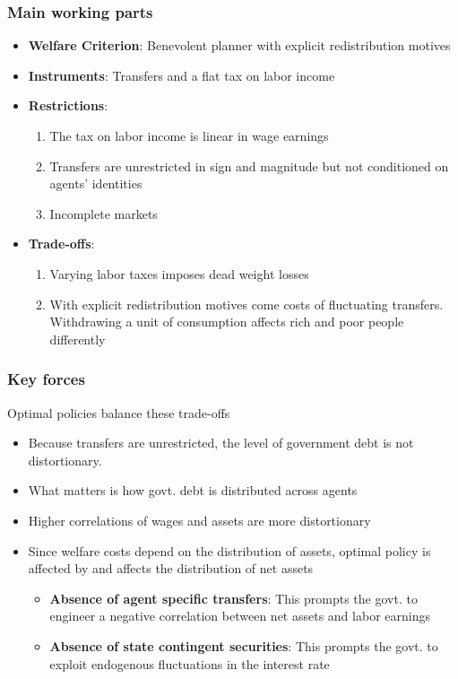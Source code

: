 \documentclass{beamer}
\begin{document}
\begin{frame}
 \frametitle{Main working parts}
\begin{itemize}
 \item \textbf{Welfare Criterion}: Benevolent planner with explicit redistribution motives
 \item \textbf{Instruments}: Transfers and a flat tax on labor income
 \item \textbf{Restrictions}:
 \begin{enumerate}
  \item The tax on labor income is linear in wage earnings
  \item Transfers are unrestricted in sign and magnitude  but not  conditioned on agents' identities
  \item Incomplete markets
 \end{enumerate}
\item \textbf{Trade-offs}:
\begin{enumerate}
\item Varying labor taxes imposes dead weight losses 
\item With  explicit redistribution motives come costs of fluctuating transfers. Withdrawing a unit of consumption affects rich and poor people differently
\end{enumerate}
\end{itemize}
\end{frame}
\begin{frame}
 \frametitle{Key forces}
 Optimal policies balance these trade-offs
 \begin{itemize}
 \item Because transfers are unrestricted, the level of government debt is not distortionary.
 \item  What matters is how govt. debt is distributed across agents
 \item Higher correlations of wages and assets are more distortionary
 \item Since welfare costs depend on the distribution of assets, optimal policy is affected by and affects the distribution of net assets
\begin{itemize}
\item \textbf{Absence of agent specific transfers}: This prompts the govt. to engineer  a negative correlation between net assets and labor earnings
\item \textbf{Absence of state contingent securities}: This prompts the govt. to exploit endogenous fluctuations in the interest rate
\end{itemize}

 \end{itemize}

\end{frame}
\end{document}

